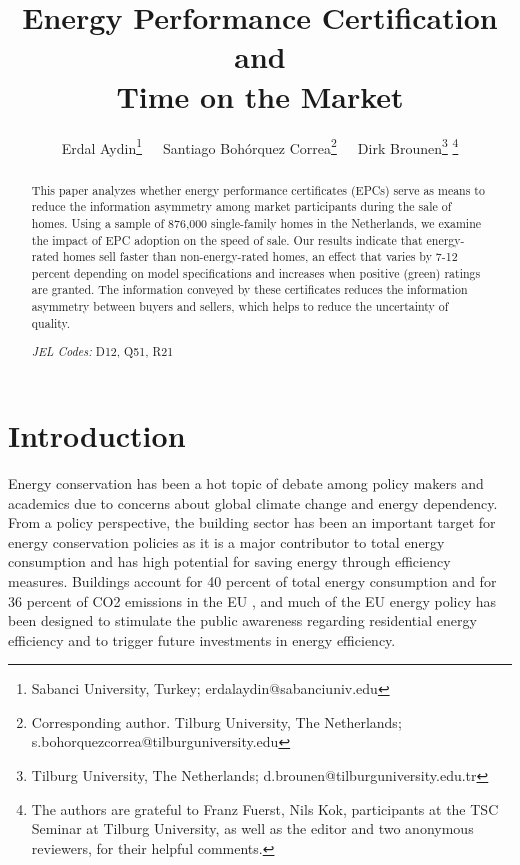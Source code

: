 \documentclass[12pt]{article}
\begin{document}
\title{Energy Performance Certification and \\Time on the Market}
\author{Erdal Aydin\thanks{\scriptsize Sabanci University, Turkey; erdalaydin@sabanciuniv.edu}\ \ \ Santiago Boh\'{o}rquez Correa\thanks{\scriptsize \noindent Corresponding author. Tilburg University, The Netherlands; s.bohorquezcorrea@tilburguniversity.edu}\ \ \ Dirk Brounen\thanks{\scriptsize  \noindent Tilburg University, The Netherlands; d.brounen@tilburguniversity.edu.tr} \thanks{\scriptsize \noindent  The authors are grateful to Franz Fuerst, Nils Kok, participants at the TSC Seminar at Tilburg University, as well as the editor and two anonymous reviewers, for their helpful comments.}}


\maketitle
\thispagestyle{empty}

\begin{abstract}
\footnotesize

\noindent This paper analyzes whether energy performance certificates (EPCs) serve as means to reduce the information asymmetry among market participants during the sale of homes. Using a sample of 876,000 single-family homes in the Netherlands, we examine the impact of EPC adoption on the speed of sale. Our results indicate that energy-rated homes sell faster than non-energy-rated homes, an effect that varies by 7-12 percent depending on model specifications and increases when positive (green) ratings are granted. The information conveyed by these certificates reduces the information asymmetry between buyers and sellers, which helps to reduce the uncertainty of quality.
 

\bigskip

{ \noindent  \textit{JEL Codes: }D12, Q51, R21}
\smallskip

\end{abstract}



\newpage

\section{Introduction}

Energy conservation has been a hot topic of debate among policy makers and academics due to concerns about global climate change and energy dependency. From a policy perspective, the building sector has been an important target for energy conservation policies as it is a major contributor to total energy consumption and has high potential for saving energy through efficiency measures. Buildings account for 40 percent of total energy consumption and for 36 percent of CO2 emissions in the EU \citep{intergovernmental2007climate}, and much of the EU energy policy has been designed to stimulate the public awareness regarding residential energy efficiency and to trigger future investments in energy efficiency. 
\end{document}
